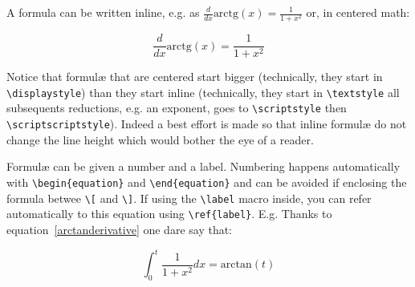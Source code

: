 A formula can be written inline, e.g. as $ \frac{d}{dx}\mbox{arctg}(x) = \frac{1}{1+x^2}$ or, in centered math:

\begin{equation}  \frac{d}{dx}\mbox{arctg}(x) = \frac{1}{1+x^2} \label{arctanderivative}\end{equation}

Notice that formulæ that are centered start bigger (technically, they start in \verb+\displaystyle+) than they start inline (technically, they start in \verb+\textstyle+ all subsequents reductions, e.g. an exponent, goes to \verb+\scriptstyle+ then \verb+\scriptscriptstyle+). Indeed a best effort is made so that inline formulæ do not change the line height which would bother the eye of a reader.

Formulæ can be given a number and a label. Numbering happens automatically with \verb+\begin{equation}+ and \verb+\end{equation}+ and can be avoided if enclosing the formula betwee \verb+\[+ and \verb+\]+. If using the \verb+\label+ macro inside, you can refer automatically to this equation using \verb+\ref{label}+. E.g. Thanks to equation~\ref{arctanderivative} one dare say that:

\begin{equation} \int_0^t \frac{1}{1+x^2} dx = \mbox{arctan}(t) \end{equation}